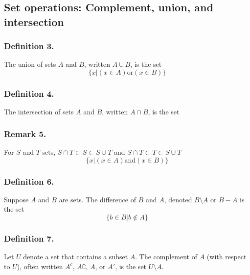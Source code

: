 \documentclass{report}
\begin{document}
\subsection*{Set operations: Complement, union, and intersection}
\subsubsection*{Definition 3.}
\par\noindent The union of sets $A$ and $B$, written $A\cup{}B$, is the set \[\{x|(x\in{}A)\mathrm{or}(x\in{}B)\}\]
\subsubsection*{Definition 4.}
\par\noindent The intersection of sets $A$ and $B$, written $A\cap{}B$, is the set
\subsubsection*{Remark 5.}
\par\noindent For $S$ and $T$ sets, $S\cap{}T\subset{}S\subset{}S\cup{}T$ and $S\cap{}T\subset{}T\subset{}S\cup{}T$
\[\{x|(x\in{}A)\mathrm{and}(x\in{}B)\}\]
\subsubsection*{Definition 6.}
\par\noindent Suppose $A$ and $B$ are sets. The difference of $B$ and $A$, denoted $B\setminus{}A$ or $B-A$ is the set
\[\{b\in{}B|b\notin{}A\}\]
\subsubsection*{Definition 7.}
\par\noindent Let $U$ denote a set that contains a subset $A$. The complement of $A$ (with respect to $U$), often written $A^{c}$, $A\complement$, $\overline{A}$, or $A'$, is the set $U\setminus{}A$.
\end{document}
